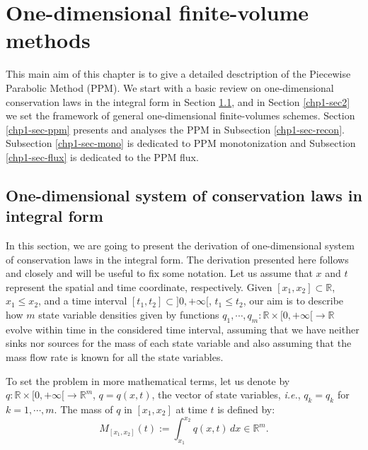 
\chapter{One-dimensional finite-volume methods}
\label{chp1-1d-fv}
This main aim of this chapter is to give a detailed desctription of
the Piecewise Parabolic Method (PPM).
We start with a basic review on one-dimensional conservation laws in
the integral form in Section \ref{chp1-sec1}, 
and in Section \ref{chp1-sec2} we set the framework of
general one-dimensional finite-volumes schemes.
Section \ref{chp1-sec-ppm} presents and analyses the PPM in Subsection \ref{chp1-sec-recon}.
Subsection \ref{chp1-sec-mono} is dedicated to PPM monotonization
and Subsection \ref{chp1-sec-flux} is dedicated to the PPM flux.

\section{One-dimensional system of conservation laws in integral form}
\label{chp1-sec1}
In this section, we are going to present the derivation of one-dimensional 
system of conservation laws in the integral form. 
The derivation presented here follows \citet{leveque:1990} and \citet{leveque:2002} closely and will
be useful to fix some notation. 
Let us assume that $x$ and $t$ represent the spatial and time coordinate, respectively.
Given $[x_1, x_2] \subset \mathbb{R}$, $x_1 \leq x_2$, and a time 
interval $[t_1, t_2] \subset ]0, +\infty[$, $t_1 \leq t_2$, 
our aim is to describe how $m$ state variable densities given by functions 
$q_1, \cdots, q_m: \mathbb{R}\times[0, +\infty[ \to \mathbb{R}$ 
evolve within time in the considered time interval, assuming that we have neither sinks nor sources 
for the mass of each state variable and also assuming that the mass
flow rate is known for all the state variables.

To set the problem in more mathematical terms, let us denote by 
${q}: \mathbb{R}\times [0, +\infty[\to \mathbb{R}^m$, 
${q} = {q}(x,t)$, the vector of state variables,
\textit{i.e.}, ${q}_k = q_k$ for $k=1, \cdots, m$.
The mass of ${q}$ in $[x_1, x_2]$ at time $t$ is defined by:
\begin{equation}
	\label{chp1-sec1-eq1}
	{M}_{[x_1, x_2]}(t) := \int_{x_1}^{x_2} {q}(x,t) \,dx \in \mathbb{R}^m.
\end{equation}

